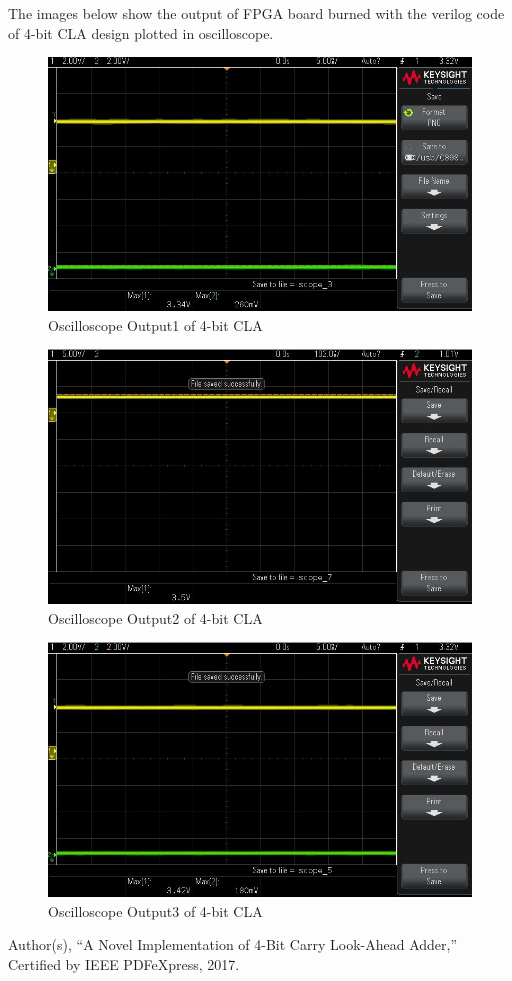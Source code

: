 \documentclass[conference]{IEEEtran}
\begin{document}
The images below show the output of FPGA board burned with the verilog code of 4-bit CLA design plotted in oscilloscope.

\begin{figure}[H]
    \centering
    \includegraphics[width=1\linewidth]{oscillo1.jpg}
    \caption{Oscilloscope Output1 of 4-bit CLA}
    \label{fig:fpga}
\end{figure}

\begin{figure}[H]
    \centering
    \includegraphics[width=1\linewidth]{oscillo2.jpg}
    \caption{Oscilloscope Output2 of 4-bit CLA}
    \label{fig:oscilloscope}
\end{figure}

\begin{figure}[H]
    \centering
    \includegraphics[width=1\linewidth]{oscillo3.jpg}
    \caption{Oscilloscope Output3 of 4-bit CLA}
    \label{fig:oscilloscope}
\end{figure}


\begin{thebibliography}{00}
     Author(s), ``A Novel Implementation of 4-Bit Carry Look-Ahead Adder,'' Certified by IEEE PDFeXpress, 2017.
    \end{thebibliography}
    
\end{document}
